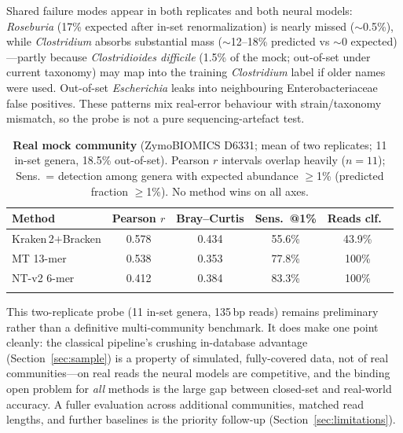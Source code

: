 Shared failure modes appear in both replicates and both neural models:
\emph{Roseburia} (17\% expected after in-set renormalization) is nearly missed
($\sim$0.5\%), while \emph{Clostridium} absorbs substantial mass
($\sim$12--18\% predicted vs $\sim$0 expected)---partly because
\emph{Clostridioides difficile} (1.5\% of the mock; out-of-set under current
taxonomy) may map into the training \emph{Clostridium} label if older names
were used. Out-of-set \emph{Escherichia} leaks into neighbouring
Enterobacteriaceae false positives. These patterns mix real-error behaviour with
strain/taxonomy mismatch, so the probe is not a pure sequencing-artefact test.

\begin{table}[t]
\centering
\caption{\textbf{Real mock community} (ZymoBIOMICS D6331; mean of two
replicates; 11 in-set genera, 18.5\% out-of-set). Pearson $r$ intervals overlap
heavily ($n{=}11$); Sens.\ = detection among genera with expected
abundance $\ge$1\% (predicted fraction $\ge$1\%). No method wins on all axes.}
\label{tab:mock}
\begin{tabular*}{\columnwidth}{@{\extracolsep{\fill}}lcccc@{}}
\toprule
Method & Pearson $r$ & Bray--Curtis & Sens.\ @1\% & Reads clf.\ \\
\midrule
Kraken\,2$+$Bracken & 0.578 & 0.434 & 55.6\% & 43.9\% \\
MT 13-mer           & 0.538 & 0.353 & 77.8\% & 100\% \\
NT-v2 6-mer         & 0.412 & 0.384 & 83.3\% & 100\% \\
\botrule
\end{tabular*}
\end{table}

This two-replicate probe (11 in-set genera, 135\,bp reads) remains preliminary
rather than a definitive multi-community benchmark. It does make one point
cleanly: the classical pipeline's crushing in-database advantage
(Section~\ref{sec:sample}) is a property of simulated, fully-covered data, not
of real communities---on real reads the neural models are competitive, and the
binding open problem for \emph{all} methods is the large gap between closed-set
and real-world accuracy. A fuller evaluation across additional communities,
matched read lengths, and further baselines is the priority follow-up
(Section~\ref{sec:limitations}).
